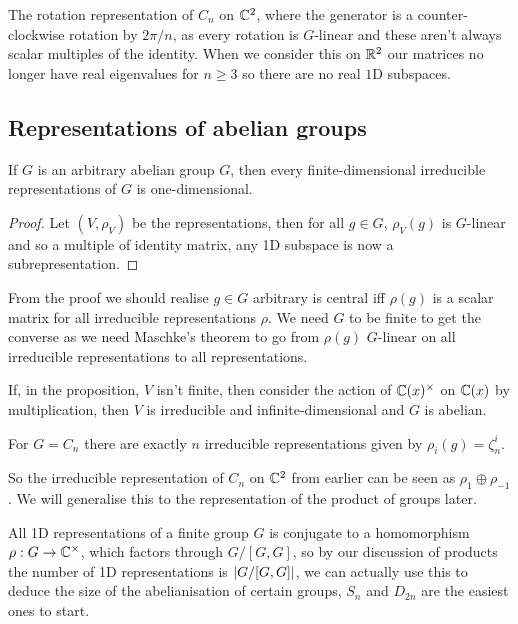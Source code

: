 \documentclass{article}
\begin{document}
The rotation representation of $C_n$ on $\mathbb{C}^2$, where the generator is a counter-clockwise rotation by $2\pi/n$, as every rotation is $G$-linear and these aren't always scalar multiples of the identity. When we consider this on $\mathbb{R}^2$ our matrices no longer have real eigenvalues for $n\geq 3$ so there are no real $1$D subspaces.

\subsection{Representations of abelian groups}

\begin{proposition}
    If $G$ is an arbitrary abelian group $G$, then every finite-dimensional irreducible representations of $G$ is one-dimensional.
    \begin{proof}
        Let $(V,\rho_V)$ be the representations, then for all $g\in G$, $\rho_V(g)$ is $G$-linear and so a multiple of identity matrix, any 1D subspace is now a subrepresentation.
    \end{proof}
\end{proposition}

From the proof we should realise $g\in G$ arbitrary is central iff $\rho(g)$ is a scalar matrix for all irreducible representations $\rho$. We need $G$ to be finite to get the converse as we need Maschke's theorem to go from $\rho(g)$ $G$-linear on all irreducible representations to all representations.

If, in the proposition, $V$ isn't finite, then consider the action of $\mathbb{C}(x)^\times$ on $\mathbb{C}(x)$ by multiplication, then $V$ is irreducible and infinite-dimensional and $G$ is abelian.

\begin{corollary}
    For $G=C_n$ there are exactly $n$ irreducible representations given by $\rho_i(g) = \zeta_n^i$.
\end{corollary}

So the irreducible representation of $C_n$ on $\mathbb{C}^2$ from earlier can be seen as $\rho_1\oplus \rho_{-1}$. We will generalise this to the representation of the product of groups later.

All 1D representations of a finite group $G$ is conjugate to a homomorphism $\rho:G\rightarrow \mathbb{C}^\times$, which factors through $G/[G,G]$, so by our discussion of products the number of 1D representations is $\left| G/[G,G] \right|$, we can actually use this to deduce the size of the abelianisation of certain groups, $S_n$ and $D_{2n}$ are the easiest ones to start.
\end{document}
